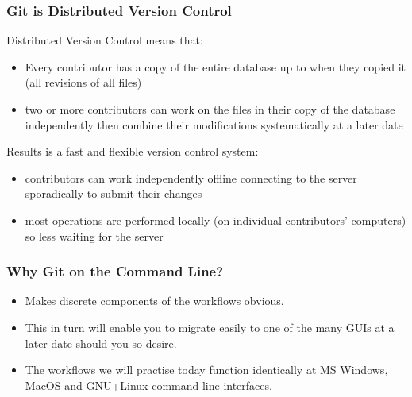 \documentclass[xcolor=dvipsnames]{beamer}
\begin{document}
\begin{frame} 
\frametitle{Git is Distributed Version Control}
Distributed Version Control means that:
\begin{itemize}
\item Every contributor has a copy of the entire database up to when they copied it (all revisions of all files)
\newline
\item two or more contributors can work on the files in their copy of the database independently then combine their modifications systematically at a later date
\newline
\newline
\end{itemize}
Results is a fast and flexible version control system: \begin{itemize}
\item contributors can work independently offline connecting to the server sporadically to submit their changes
\newline
\item most operations are performed locally (on individual contributors' computers) so less waiting for the server
\end{itemize}

\end{frame} 

\begin{frame}
\frametitle{Why Git on the Command Line?}
\begin{itemize}
\item Makes discrete components of the workflows obvious.
\newline
\item This in turn will enable you to migrate easily to one of the many GUIs at a later date should you so desire.
\newline
\item The workflows we will practise today function identically at MS Windows, MacOS and GNU+Linux command line interfaces.
\end{itemize}
\end{frame}
\end{document}
